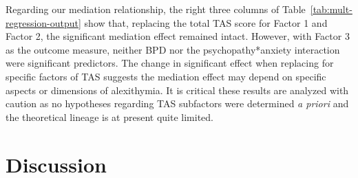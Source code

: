 \documentclass[
  man,floatsintext]{apa7}
\begin{document}
Regarding our mediation relationship, the right three columns of Table~\ref{tab:mult-regression-output} show that, replacing the total TAS score for Factor 1 and Factor 2, the significant mediation effect remained intact. However, with Factor 3 as the outcome measure, neither BPD nor the psychopathy*anxiety interaction were significant predictors. The change in significant effect when replacing for specific factors of TAS suggests the mediation effect may depend on specific aspects or dimensions of alexithymia. It is critical these results are analyzed with caution as no hypotheses regarding TAS subfactors were determined \emph{a priori} and the theoretical lineage is at present quite limited.

\hypertarget{discussion}{%
\section{Discussion}\label{discussion}}
\end{document}
